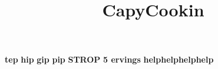 \title{CapyCookin}
\begin{center}
\maketitle
\textbf{tep}
\textbf{hip}
\textbf{gip}
\textbf{pip}
\textbf{STROP}
\textbf{5 ervings}
\textbf{helphelphelphelp}
\end{center}
